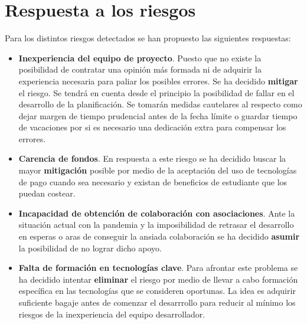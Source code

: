\vspace{-20pt}
\section{Respuesta a los riesgos}

\vspace{-5pt}
Para los distintos riesgos detectados se han propuesto las siguientes respuestas:

\vspace{-5pt}
\begin{itemize}
    \item \textbf{Inexperiencia del equipo de proyecto}. Puesto que no existe la posibilidad de contratar una opinión más formada ni de adquirir la experiencia necesaria para paliar los posibles errores. Se ha decidido \textbf{mitigar} el riesgo. Se tendrá en cuenta desde el principio la posibilidad de fallar en el desarrollo de la planificación. Se tomarán medidas cautelares al respecto como dejar margen de tiempo prudencial antes de la fecha límite o guardar tiempo de vacaciones por si es necesario una dedicación extra para compensar los errores.
    \item \textbf{Carencia de fondos}. En respuesta a este riesgo se ha decidido buscar la mayor \textbf{mitigación} posible por medio de la aceptación del uso de tecnologías de pago cuando sea necesario y existan de beneficios de estudiante que los puedan costear.
    \item \textbf{Incapacidad de obtención de colaboración con asociaciones}. Ante la situación actual con la pandemia y la imposibilidad de retrasar el desarrollo en esperas o aras de conseguir la ansiada colaboración se ha decidido \textbf{asumir} la posibilidad de no lograr dicho apoyo.
    \item \textbf{Falta de formación en tecnologías clave}. Para afrontar este problema se ha decidido intentar \textbf{eliminar} el riesgo por medio de llevar a cabo formación específica en las tecnologías que se consideren oportunas. La idea es adquirir suficiente bagaje antes de comenzar el desarrrollo para reducir al mínimo los riesgos de la inexperiencia del equipo desarrollador.
\end{itemize}